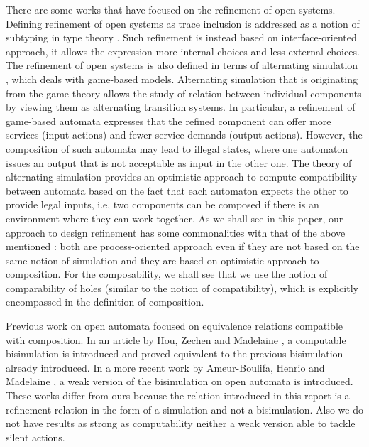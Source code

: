 \documentclass[runningheads]{llncs}
\begin{document}
There are some works that have focused on  the refinement of open systems. Defining refinement of open systems as trace inclusion  is  addressed  as a notion of subtyping in type theory 
\cite{GayH:2005,BravettiZ:2021}. Such refinement is  instead based  on interface-oriented approach, it allows the expression more internal choices and less external choices. The refinement of open systems is also defined in terms of  alternating simulation \cite{Alur:1998,deAlfaro:2021}, which deals with game-based models.
Alternating simulation that is originating from the game theory \cite{deAlfaro:2003} allows  the study of relation between individual components by viewing them as alternating transition systems. In particular,  a refinement of game-based automata expresses that the refined component can offer more services (input actions) and fewer service demands (output actions). However, the composition of such automata may
lead to illegal states, where one automaton issues an output that is not acceptable as input in the other one. The theory of alternating simulation provides an optimistic approach to compute compatibility between automata based on the fact that each automaton expects the other to provide  legal inputs, i.e, two components can be composed if there is an environment where they can work together. As we shall see in this paper, 
our approach to design refinement  has some commonalities with that of the above mentioned \cite{deAlfaro:2021}: both are process-oriented approach even if they are not based on the same notion of simulation and they are based on optimistic approach to composition. 
For the composability, we shall see that we use the notion of comparability of holes (similar to the notion of compatibility), which is explicitly encompassed in the definition of composition.

 



Previous work on open automata focused on equivalence relations compatible with composition.
In an article by Hou, Zechen and Madelaine \cite{10.1145/3372884.3373161}, a computable bisimulation is introduced and proved equivalent to the previous bisimulation already introduced.
In a more recent work by Ameur-Boulifa, Henrio and Madelaine \cite{2007.10770}, a weak version of the bisimulation on open automata is introduced.
These works differ from ours because the relation introduced in this report is a refinement relation in the form of a simulation and not a bisimulation.
Also we do not have results as strong as computability neither a weak version able to tackle silent actions.
\end{document}
